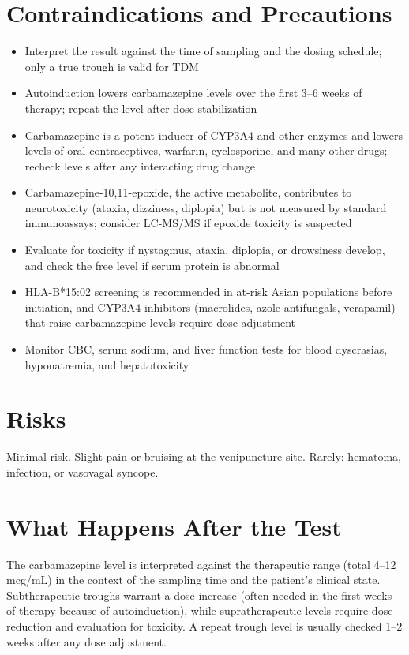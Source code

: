 \section*{Contraindications and Precautions}
\begin{itemize}
  \item Interpret the result against the time of sampling and the dosing schedule; only a true trough is valid for TDM
  \item Autoinduction lowers carbamazepine levels over the first 3--6 weeks of therapy; repeat the level after dose stabilization
  \item Carbamazepine is a potent inducer of CYP3A4 and other enzymes and lowers levels of oral contraceptives, warfarin, cyclosporine, and many other drugs; recheck levels after any interacting drug change
  \item Carbamazepine-10,11-epoxide, the active metabolite, contributes to neurotoxicity (ataxia, dizziness, diplopia) but is not measured by standard immunoassays; consider LC-MS/MS if epoxide toxicity is suspected
  \item Evaluate for toxicity if nystagmus, ataxia, diplopia, or drowsiness develop, and check the free level if serum protein is abnormal
  \item HLA-B*15:02 screening is recommended in at-risk Asian populations before initiation, and CYP3A4 inhibitors (macrolides, azole antifungals, verapamil) that raise carbamazepine levels require dose adjustment
  \item Monitor CBC, serum sodium, and liver function tests for blood dyscrasias, hyponatremia, and hepatotoxicity
\end{itemize}
\section*{Risks}
Minimal risk. Slight pain or bruising at the venipuncture site. Rarely: hematoma, infection, or vasovagal syncope.
\section*{What Happens After the Test}
The carbamazepine level is interpreted against the therapeutic range (total 4--12 mcg/mL) in the context of the sampling time and the patient's clinical state. Subtherapeutic troughs warrant a dose increase (often needed in the first weeks of therapy because of autoinduction), while supratherapeutic levels require dose reduction and evaluation for toxicity. A repeat trough level is usually checked 1--2 weeks after any dose adjustment.
